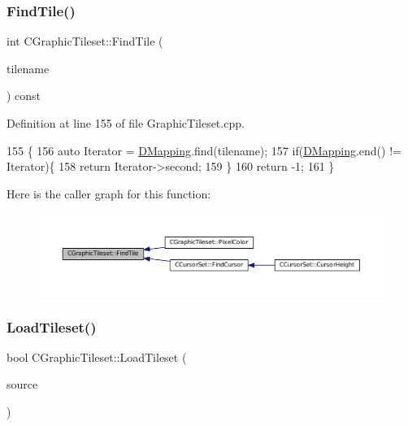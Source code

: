 \subsubsection{\texorpdfstring{Find\+Tile()}{FindTile()}}
{\footnotesize\ttfamily int C\+Graphic\+Tileset\+::\+Find\+Tile (\begin{DoxyParamCaption}\item[{const std\+::string \&}]{tilename }\end{DoxyParamCaption}) const}



Definition at line 155 of file Graphic\+Tileset.\+cpp.


\begin{DoxyCode}
155                                                             \{
156     \textcolor{keyword}{auto} Iterator = \hyperlink{classCGraphicTileset_a17cd13f68f77ea4976b59b37b10e914b}{DMapping}.find(tilename);
157     \textcolor{keywordflow}{if}(\hyperlink{classCGraphicTileset_a17cd13f68f77ea4976b59b37b10e914b}{DMapping}.end() != Iterator)\{
158         \textcolor{keywordflow}{return} Iterator->second;
159     \}
160     \textcolor{keywordflow}{return} -1;
161 \}
\end{DoxyCode}
Here is the caller graph for this function\+:\nopagebreak
\begin{figure}[H]
\begin{center}
\leavevmode
\includegraphics[width=350pt]{classCGraphicTileset_ab8f2c2b2f2095b17d53c3dc475d5685c_icgraph}
\end{center}
\end{figure}
\hypertarget{classCGraphicTileset_a7d47754f26f03958be28a064f54eef1d}{}\label{classCGraphicTileset_a7d47754f26f03958be28a064f54eef1d} 
\subsubsection{\texorpdfstring{Load\+Tileset()}{LoadTileset()}}
{\footnotesize\ttfamily bool C\+Graphic\+Tileset\+::\+Load\+Tileset (\begin{DoxyParamCaption}\item[{std\+::shared\+\_\+ptr$<$ \hyperlink{classCDataSource}{C\+Data\+Source} $>$}]{source }\end{DoxyParamCaption})}



